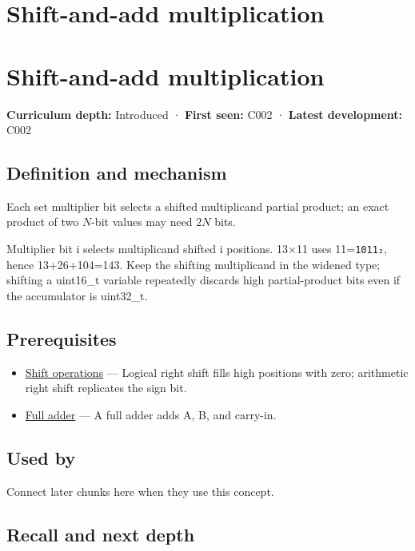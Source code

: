 \hypertarget{appendix-a65290d66ed9}{}
\section*{Shift-and-add multiplication}
\section{Shift-and-add multiplication}\label{shift-and-add-multiplication}

\textbf{Curriculum depth:} Introduced · \textbf{First seen:} C002 · \textbf{Latest development:} C002

\subsection{Definition and mechanism}\label{definition-and-mechanism}

Each set multiplier bit selects a shifted multiplicand partial product; an exact product of two \(N\)-bit values may need \(2N\) bits.

Multiplier bit i selects multiplicand shifted i positions. 13×11 uses 11=\texttt{1011₂}, hence 13+26+104=143. Keep the shifting multiplicand in the widened type; shifting a uint16\_t variable repeatedly discards high partial-product bits even if the accumulator is uint32\_t.

\subsection{Prerequisites}\label{prerequisites}

\begin{itemize}
\tightlist
\item
  \hyperref[appendix-73425b25118e]{Shift operations} --- Logical right shift fills high positions with zero; arithmetic right shift replicates the sign bit.
\item
  \hyperref[appendix-d1a5b1e520c2]{Full adder} --- A full adder adds A, B, and carry-in.
\end{itemize}

\subsection{Used by}\label{used-by}

Connect later chunks here when they use this concept.

\subsection{Recall and next depth}\label{recall-and-next-depth}

